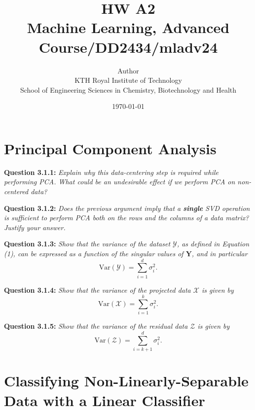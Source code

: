 \documentclass{article}
\title{HW A2\\\Large{Machine Learning, Advanced Course/DD2434/mladv24}}
\author{Author \\ KTH Royal Institute of Technology\\ School of Engineering Sciences in Chemistry, Biotechnology and Health}
\date{\today}
\begin{document}
\maketitle

\fancyfoot[C]{\thepage}
\begin{multicols}{2}

    \section{Principal Component Analysis}

    \noindent \textbf{Question 3.1.1:}  
    \textit{Explain why this data-centering step is required while performing PCA. What could be an undesirable effect if we perform PCA on non-centered data?}  

    \vspace{0.5cm}

    \noindent \textbf{Question 3.1.2:}  
    \textit{Does the previous argument imply that a \textbf{single} SVD operation is sufficient to perform PCA both on the rows and the columns of a data matrix? Justify your answer.}  

    \vspace{0.5cm}

    \noindent \textbf{Question 3.1.3:}  
    \textit{Show that the variance of the dataset \( \mathcal{Y} \), as defined in Equation (1), can be expressed as a function of the singular values of \( \mathbf{Y} \), and in particular}  
    \[
    \text{Var}(\mathcal{Y}) = \sum_{i=1}^d \sigma_i^2.
    \]

    \vspace{0.5cm}

    \noindent \textbf{Question 3.1.4:}  
    \textit{Show that the variance of the projected data \( \mathcal{X} \) is given by}  
    \[
    \text{Var}(\mathcal{X}) = \sum_{i=1}^k \sigma_i^2.
    \]

    \vspace{0.5cm}

    \noindent \textbf{Question 3.1.5:}  
    \textit{Show that the variance of the residual data \( \mathcal{Z} \) is given by}  
    \[
    \text{Var}(\mathcal{Z}) = \sum_{i=k+1}^d \sigma_i^2.
    \]

    \newpage

    \section{Classifying Non-Linearly-Separable Data with a Linear Classifier}


\end{multicols}
\end{document}
